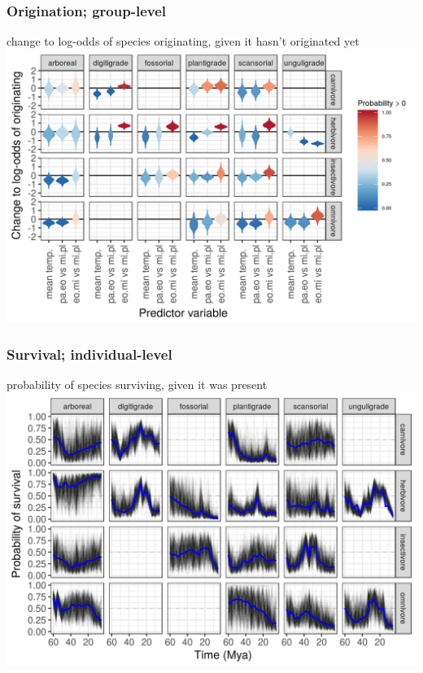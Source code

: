 \documentclass[aspectratio=169]{beamer}
\begin{document}
\begin{frame}
  \frametitle{Origination; group-level}
  \begin{center}
    change to log-odds of species originating, given it hasn't originated yet
    \includegraphics[height=0.775\textheight,width=\textwidth,keepaspectratio=true]{figure/group_on_origin_bd}
  \end{center}
\end{frame}

\begin{frame}
  \frametitle{Survival; individual-level}
  \begin{center}
    probability of species surviving, given it was present
    \includegraphics[height=0.775\textheight,width=\textwidth,keepaspectratio=true]{figure/ecotype_survival_bd}
  \end{center}
\end{frame}
\end{document}
